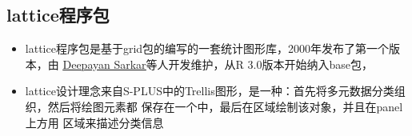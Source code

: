 \subsection{lattice程序包}
\begin{frame}[t,fragile]{\subsecname}{}
\begin{itemize}
\item lattice程序包是基于grid包的编写的一套统计图形库，2000年发布了第一个版本，由
\href{https://www.isid.ac.in/~deepayan/}{\uline{Deepayan Sarkar}}等人开发维护，从R 3.0版本开始纳入base包，
\item lattice设计理念来自S-PLUS中的Trellis图形，是一种：首先将多元数据分类组织，然后将绘图元素都 保存在一个中，最后在区域绘制该对象，并且在panel上方用
区域来描述分类信息
\end{itemize}

\vspace{-8pt}
\begin{overlayarea}{\textwidth}{\textheight}


\end{overlayarea}  
\end{frame} 

